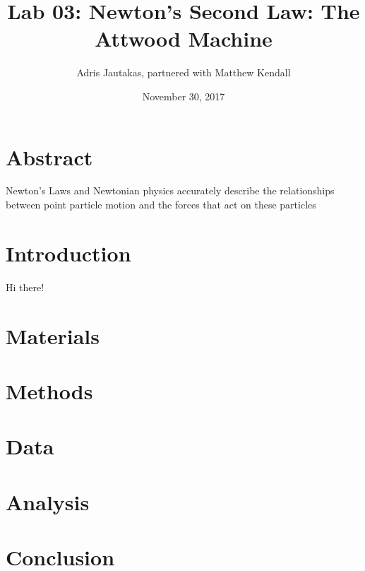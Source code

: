 \documentclass[12pt]{article}
\title{Lab 03: Newton's Second Law: The Attwood Machine}
\author{Adris Jautakas, partnered with Matthew Kendall}
\date{November 30, 2017}
\begin{document}
   \maketitle

    \section*{Abstract}
        {\small 
            Newton's Laws and Newtonian physics accurately describe the 
            relationships between point particle motion and the forces
            that act on these particles
            
        }
    \section{Introduction}
    Hi there!
    \section{Materials}


    \section{Methods}

    \section{Data}

    \section{Analysis}

    \section{Conclusion}
\end{document}
